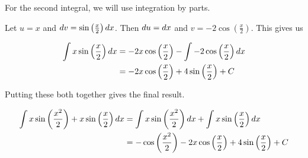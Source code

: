 \documentclass[]{ximera}
\begin{document}
\begin{freeResponse}
For the second integral, we will use integration by parts. 

Let $u =x $ and $\mathop{}\!d v =   \sin\left(\frac{x}{2}\right) \mathop{}\!d x$. Then $\mathop{}\!d u =  \mathop{}\!d x$ and $v =  -2 \cos\left(\frac{x}{2}\right)$. This gives us

\begin{align*}
\int  x\sin\left(\frac{x}{2}\right) \mathop{}\!d x &= -2x \cos\left(\frac{x}{2}\right) - \int -2 \cos\left(\frac{x}{2}\right) \mathop{}\!d x \\
&= -2x \cos\left(\frac{x}{2}\right) + 4 \sin\left(\frac{x}{2}\right) +C
\end{align*}

Putting these both together gives the final result.	

\begin{align*}
\int x\sin\left(\frac{x^2}{2}\right) + x\sin\left(\frac{x}{2}\right) \mathop{}\!d x &= \int x\sin\left(\frac{x^2}{2}\right)  \mathop{}\!d x+\int  x\sin\left(\frac{x}{2}\right) \mathop{}\!d x\\
&= -\cos\left(\frac{x^2}{2}\right)-2x \cos\left(\frac{x}{2}\right) + 4 \sin\left(\frac{x}{2}\right) +C
\end{align*}	
\end{freeResponse}
\end{document}
